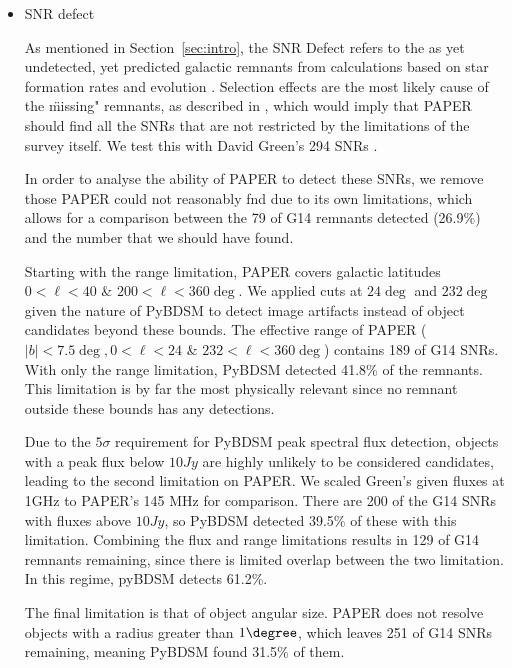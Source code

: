 \documentclass[useAMS,usenatbib]{mn2e}
\begin{document}
\begin{itemize}
\item SNR defect

As mentioned in Section~\ref{sec:intro}, the SNR Defect refers to the as yet undetected, yet predicted galactic remnants from calculations based on star formation rates and evolution \citep{Li.91,Pavlovic.13}.  Selection effects are the most likely cause of the \"missing" remnants, as described in , which would imply that PAPER should find all the SNRs that are not restricted by the limitations of the survey itself.  We test this with David Green's 294 SNRs .  

In order to analyse the ability of PAPER to detect these SNRs, we remove those PAPER could not reasonably fnd due to its own limitations, which allows for a comparison between the 79 of G14 remnants detected (26.9\%) and the number that we should have found.  

Starting with the range limitation, PAPER covers galactic latitudes $0 < \ell < 40$ \& $200 < \ell < 360 \deg$.  We applied cuts at $24 \deg$ and $232 \deg$ given the nature of PyBDSM to detect image artifacts instead of object candidates beyond these bounds.  The effective range of PAPER ($|b| < 7.5 \deg, 0 < \ell < 24$ \& $232 < \ell < 360 \deg$) contains 189 of G14 SNRs.  With only the range limitation, PyBDSM detected 41.8\% of the remnants.  This limitation is by far the most physically relevant since no remnant outside these bounds has any detections. 

Due to the $5σ$ requirement for PyBDSM peak spectral flux detection, objects with a peak flux below $10 Jy$ are highly unlikely to be considered candidates, leading to the second limitation on PAPER.  We scaled Green’s given fluxes at 1GHz to PAPER’s 145 MHz for comparison.  There are 200 of the G14 SNRs with fluxes above $10 Jy$, so PyBDSM detected 39.5\% of these with this limitation.  Combining the flux and range limitations results in 129 of G14 remnants remaining, since there is limited overlap between the two limitation.  In this regime, pyBDSM detects 61.2\%.  

The final limitation is that of object angular size.  PAPER does not resolve objects with a radius greater than $1 \degree$, which leaves 251 of G14 SNRs remaining, meaning PyBDSM found 31.5\% of them.  


\end{itemize}
\end{document}
